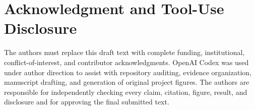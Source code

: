 \documentclass[journal]{IEEEtran}
\begin{document}
\section*{Acknowledgment and Tool-Use Disclosure}

The authors must replace this draft text with complete funding, institutional,
conflict-of-interest, and contributor acknowledgments. OpenAI Codex was used
under author direction to assist with repository auditing, evidence
organization, manuscript drafting, and generation of original project figures.
The authors are responsible for independently checking every claim, citation,
figure, result, and disclosure and for approving the final submitted text.

\clearpage
\balance



\end{document}
